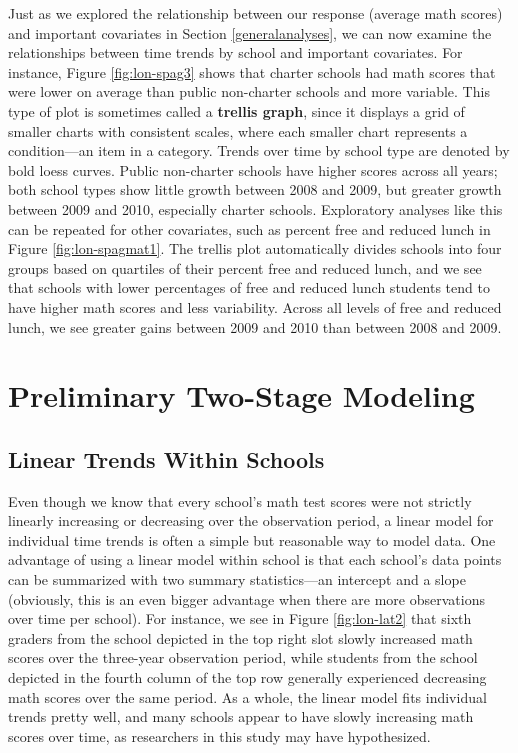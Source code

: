 \documentclass[
]{krantz}
\begin{document}
Just as we explored the relationship between our response (average math scores) and important covariates in Section \ref{generalanalyses}, we can now examine the relationships between time trends by school and important covariates. For instance, Figure \ref{fig:lon-spag3} shows that charter schools had math scores that were lower on average than public non-charter schools and more variable. This type of plot is sometimes called a \textbf{trellis graph},  since it displays a grid of smaller charts with consistent scales, where each smaller chart represents a condition---an item in a category. Trends over time by school type are denoted by bold loess curves. Public non-charter schools have higher scores across all years; both school types show little growth between 2008 and 2009, but greater growth between 2009 and 2010, especially charter schools. Exploratory analyses like this can be repeated for other covariates, such as percent free and reduced lunch in Figure \ref{fig:lon-spagmat1}. The trellis plot automatically divides schools into four groups based on quartiles of their percent free and reduced lunch, and we see that schools with lower percentages of free and reduced lunch students tend to have higher math scores and less variability. Across all levels of free and reduced lunch, we see greater gains between 2009 and 2010 than between 2008 and 2009.

\section{Preliminary Two-Stage Modeling}\label{twostage9}

\subsection{Linear Trends Within Schools}\label{lineartwostage}

Even though we know that every school's math test scores were not strictly linearly increasing or decreasing over the observation period, a linear model for individual time trends is often a simple but reasonable way to model data. One advantage of using a linear model within school is that each school's data points can be summarized with two summary statistics---an intercept and a slope (obviously, this is an even bigger advantage when there are more observations over time per school). For instance, we see in Figure \ref{fig:lon-lat2} that sixth graders from the school depicted in the top right slot slowly increased math scores over the three-year observation period, while students from the school depicted in the fourth column of the top row generally experienced decreasing math scores over the same period. As a whole, the linear model fits individual trends pretty well, and many schools appear to have slowly increasing math scores over time, as researchers in this study may have hypothesized.
\end{document}
